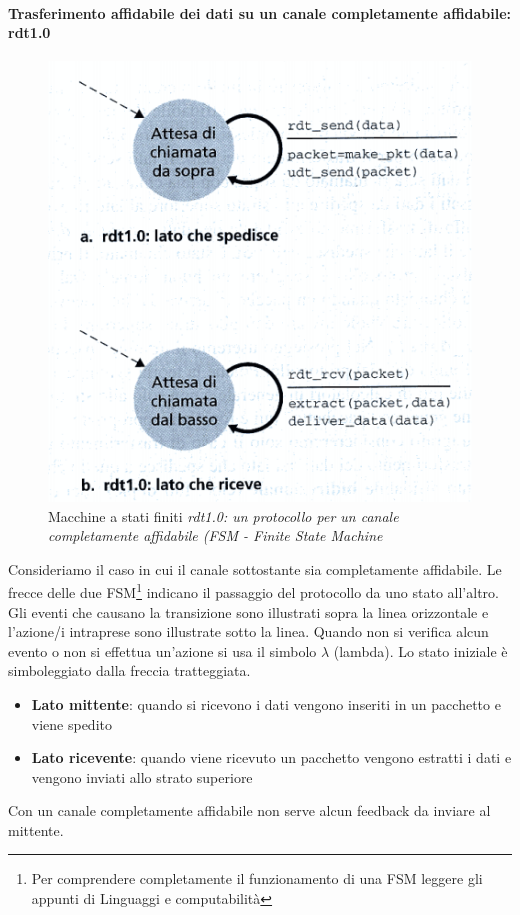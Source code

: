 \documentclass[11pt,a4paper]{book}
\begin{document}
\paragraph{Trasferimento affidabile dei dati su un canale completamente affidabile: rdt1.0}
\begin{figure}
	\includegraphics[scale=0.6]{img/017.png}
	\caption{Macchine a stati finiti \textit{rdt1.0: un protocollo per un canale completamente affidabile (FSM - Finite State Machine}}
\end{figure}
Consideriamo il caso in cui il canale sottostante sia completamente affidabile.
Le frecce delle due FSM\footnote{Per comprendere completamente il funzionamento di una FSM leggere gli appunti di Linguaggi e computabilità} indicano il passaggio del protocollo da uno stato all'altro. Gli eventi che causano la transizione sono illustrati sopra la linea orizzontale e l'azione/i intraprese sono illustrate sotto la linea. Quando non si verifica alcun evento o non si effettua un'azione si usa il simbolo $\lambda$ (lambda). Lo stato iniziale è simboleggiato dalla freccia tratteggiata. \\
\begin{itemize}
	\item \textbf{Lato mittente}: quando si ricevono i dati vengono inseriti in un pacchetto e viene spedito
	\item \textbf{Lato ricevente}: quando viene ricevuto un pacchetto vengono estratti i dati e vengono inviati allo strato superiore
\end{itemize}
Con un canale completamente affidabile non serve alcun feedback da inviare al mittente.
\end{document}
